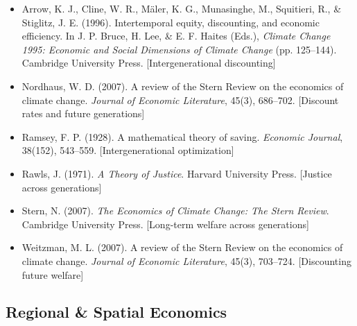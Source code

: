 \begin{itemize}

\item Arrow, K. J., Cline, W. R., Mäler, K. G., Munasinghe, M., Squitieri, R., \& Stiglitz, J. E. (1996). 
Intertemporal equity, discounting, and economic efficiency. 
In J. P. Bruce, H. Lee, \& E. F. Haites (Eds.), \textit{Climate Change 1995: Economic and Social Dimensions of Climate Change} (pp. 125--144). 
Cambridge University Press.
[Intergenerational discounting]

\item Nordhaus, W. D. (2007). 
A review of the Stern Review on the economics of climate change. 
\textit{Journal of Economic Literature}, 45(3), 686--702.
[Discount rates and future generations]

\item Ramsey, F. P. (1928). 
A mathematical theory of saving. 
\textit{Economic Journal}, 38(152), 543--559.
[Intergenerational optimization]

\item Rawls, J. (1971). 
\textit{A Theory of Justice}. 
Harvard University Press.
[Justice across generations]

\item Stern, N. (2007). 
\textit{The Economics of Climate Change: The Stern Review}. 
Cambridge University Press.
[Long-term welfare across generations]

\item Weitzman, M. L. (2007). 
A review of the Stern Review on the economics of climate change. 
\textit{Journal of Economic Literature}, 45(3), 703--724.
[Discounting future welfare]

\end{itemize}

\subsection*{Regional \& Spatial Economics}

